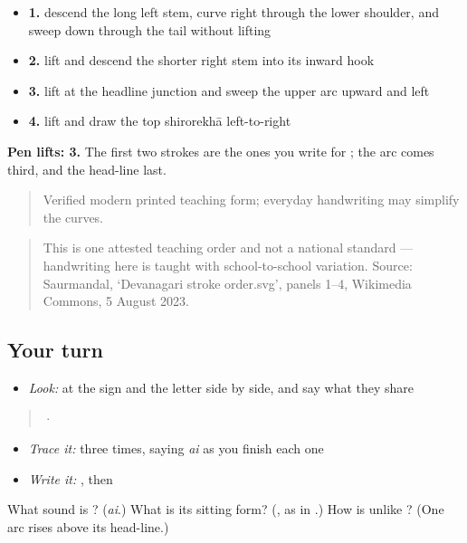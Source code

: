 \begin{itemize}
\raggedright
  \item \textbf{1.} descend the long left stem, curve right through the lower shoulder, and sweep down through the tail without lifting
  \item \textbf{2.} lift and descend the shorter right stem into its inward hook
  \item \textbf{3.} lift at the headline junction and sweep the upper arc upward and left
  \item \textbf{4.} lift and draw the top shirorekhā left-to-right
\end{itemize}

\textbf{Pen lifts: 3.} The first two strokes are the ones you write for \textbf{}; the arc comes third, and the head-line last.

\begin{quote}
Verified modern printed teaching form; everyday handwriting may simplify the curves.
\end{quote}

\begin{quote}
This is one attested teaching order and not a national standard — handwriting here is taught with school-to-school variation. Source: Saurmandal, ‘Devanagari  stroke order.svg’, panels 1–4, Wikimedia Commons, 5 August 2023.
\end{quote}

\subsection*{Your turn}
\begin{itemize}
\raggedright
  \item \emph{Look:} at the sign and the letter side by side, and say what they share
\end{itemize}

\begin{quote}
  ·  
\end{quote}

\begin{itemize}
\raggedright
  \item \emph{Trace it:}  three times, saying \emph{ai} as you finish each one
  \item \emph{Write it:} \textbf{}, then \textbf{}
\end{itemize}

\begin{tcolorbox}[breakable,colback=teal!4,colframe=teal!35!black,title={Before you move on}]
What sound is \textbf{}? (\emph{ai}.) What is its sitting form? (\textbf{}, as in \textbf{}.) How is \textbf{} unlike \textbf{}? (One arc rises above its head-line.)
\end{tcolorbox}

